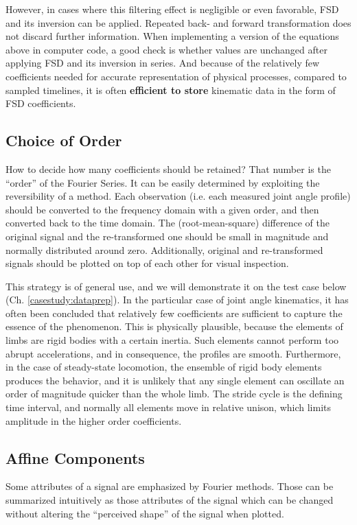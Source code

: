 However, in cases where this filtering effect is negligible or even favorable, FSD and its inversion can be applied.
Repeated back- and forward transformation does not discard further information.
When implementing a version of the equations above in computer code, a good check is whether values are unchanged after applying FSD and its inversion in series.
And because of the relatively few coefficients needed for accurate representation of physical processes, compared to sampled timelines, it is often \textbf{efficient to store} kinematic data in the form of FSD coefficients.

\subsection{Choice of Order}
\label{sec:org1faeb3d}
How to decide how many coefficients should be retained?
That number is the ``order'' of the Fourier Series.
It can be easily determined by exploiting the reversibility of a method.
Each observation (i.e. each measured joint angle profile) should be converted to the frequency domain with a given order, and then converted back to the time domain.
The (root-mean-square) difference of the original signal and the re-transformed one should be small in magnitude and normally distributed around zero.
Additionally, original and re-transformed signals should be plotted on top of each other for visual inspection.


This strategy is of general use, and we will demonstrate it on the test case below (Ch. \ref{casestudy:dataprep}).
In the particular case of joint angle kinematics, it has often been concluded that relatively few coefficients are sufficient to capture the essence of the phenomenon.
This is physically plausible, because the elements of limbs are rigid bodies with a certain inertia.
Such elements cannot perform too abrupt accelerations, and in consequence, the profiles are smooth.
Furthermore, in the case of steady-state locomotion, the ensemble of rigid body elements produces the behavior, and it is unlikely that any single element can oscillate an order of magnitude quicker than the whole limb.
The stride cycle is the defining time interval, and normally all elements move in relative unison, which limits amplitude in the higher order coefficients.


\subsection{Affine Components}
\label{sec:org00b707b}
Some attributes of a signal are emphasized by Fourier methods.
Those can be summarized intuitively as those attributes of the signal which can be changed without altering the ``perceived shape'' of the signal when plotted.

